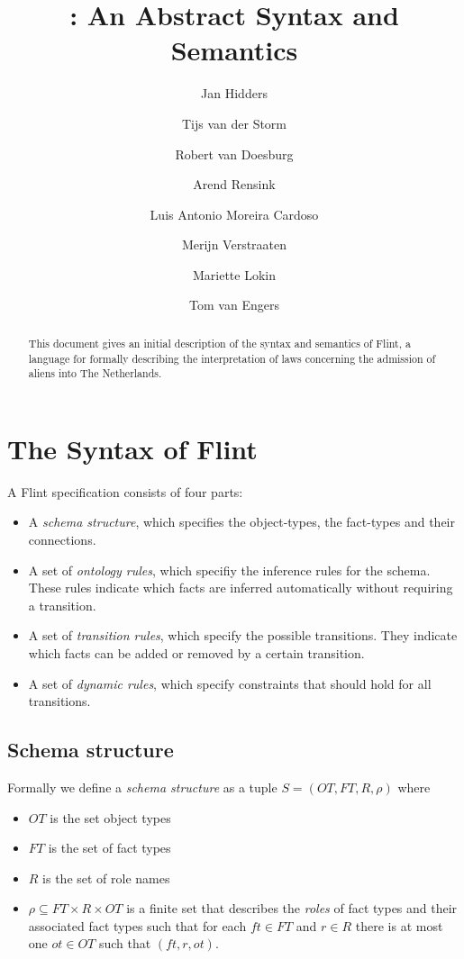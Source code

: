 \documentclass[11pt]{amsart}
\title{\flint: An Abstract Syntax and Semantics}
\author[Jan Hidders et al.]{Jan Hidders \and
  Tijs van der Storm \and 
  Robert van Doesburg \and 
  Arend Rensink \and
  Luis Antonio Moreira Cardoso \and
  Merijn Verstraaten \and
  Mariette Lokin \and
  Tom van Engers
}
\date{}                                           %
\newcommand{\flint}{{\sc Flint}}
\newcommand{\deriv}[1]{{#1}^{\textrm{\textbf{deriv}}}}
\newcommand{\decl}[1]{{#1}^{\textrm{\textbf{decl}}}}
\begin{document}
\maketitle

\begin{abstract}
This document gives an initial description of the syntax and semantics of \flint, a language for formally describing the interpretation of laws concerning the admission of aliens into The Netherlands.
\end{abstract}

\tableofcontents

\section{The Syntax of \flint}

A \flint{} specification consists of four parts:
\begin{itemize}
  \item A \emph{schema structure}, which specifies the object-types, the fact-types and their connections.
  \item A set of \emph{ontology rules}, which specifiy the inference rules for the schema. These rules indicate which facts are inferred automatically without requiring a transition.
  \item A set of \emph{transition rules}, which specify the possible transitions. They indicate which facts can be added or removed by a certain transition.
  \item A set of \emph{dynamic rules}, which specify constraints that should hold for all transitions.
\end{itemize}

\subsection{Schema structure}

Formally we define a \emph{schema structure} as a tuple $S = (OT, FT, R, \rho)$ where
\begin{itemize}
  \item $OT$ is the set object types %
  \item $FT$ is the set of fact types %
  \item $R$ is the set of role names
  \item $\rho \subseteq FT \times R \times OT$ is a finite set that describes the \emph{roles} of fact types and their associated fact types such that for each $ft \in FT$ and $r \in R$ there is at most one $ot \in OT$ such that $(ft, r, ot)$.
\end{itemize} 
  
\end{document}
